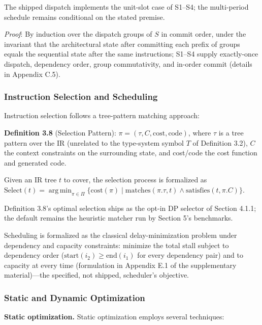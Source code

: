 \documentclass[
  sigconf,
  anonymous]{acmart}
\DeclareMathOperator*{\argmin}{arg\,min}
\begin{document}
The shipped dispatch implements the unit-slot case of S1--S4; the
multi-period schedule remains conditional on the stated premise.

\emph{Proof}: By induction over the dispatch groups of \(S\) in commit
order, under the invariant that the architectural state after committing
each prefix of groups equals the sequential state after the same
instructions; S1--S4 supply exactly-once dispatch, dependency order,
group commutativity, and in-order commit (details in Appendix C.5).

\subsubsection{Instruction Selection and
Scheduling}\label{instruction-selection-and-scheduling}

Instruction selection follows a tree-pattern matching approach:

\textbf{Definition 3.8} (Selection Pattern):
\(\pi = (\tau, C, \text{cost}, \text{code})\), where \(\tau\) is a tree
pattern over the IR (unrelated to the type-system symbol \(T\) of
Definition 3.2), \(C\) the context constraints on the surrounding state,
and cost/code the cost function and generated code.

Given an IR tree \(t\) to cover, the selection process is formalized as
\(\text{Select}(t) = \argmin_{\pi \in \Pi} \{\text{cost}(\pi) \mid \text{matches}(\pi.\tau, t) \land \text{satisfies}(t, \pi.C)\}\).

Definition 3.8's optimal selection ships as the opt-in DP selector of
Section 4.1.1; the default remains the heuristic matcher run by Section
5's benchmarks.

Scheduling is formalized as the classical delay-minimization problem
under dependency and capacity constraints: minimize the total stall
subject to dependency order (\(\text{start}(i_2) \geq \text{end}(i_1)\)
for every dependency pair) and to capacity at every time (formulation in
Appendix E.1 of the supplementary material)---the specified, not
shipped, scheduler's objective.

\subsubsection{Static and Dynamic
Optimization}\label{static-and-dynamic-optimization}

\textbf{Static optimization.} Static optimization employs several
techniques:
\end{document}
